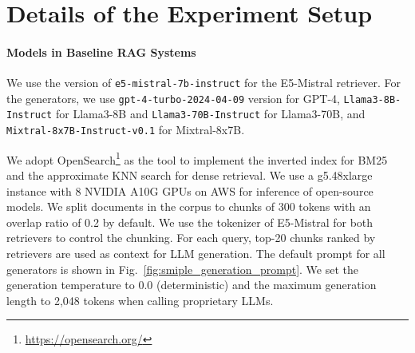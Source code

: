 \section{Details of the Experiment Setup}
\label{appendix:experiment_setup_detail}

\paragraph{Models in Baseline RAG Systems} 
We use the version of \texttt{e5-mistral-7b-instruct} for the E5-Mistral retriever. For the generators, we use \texttt{gpt-4-turbo-2024-04-09} version for GPT-4, \texttt{Llama3-8B-Instruct} for Llama3-8B and \texttt{Llama3-70B-Instruct} for Llama3-70B, and \texttt{Mixtral-8x7B-Instruct-v0.1} for Mixtral-8x7B. 

We adopt OpenSearch\footnote{\url{https://opensearch.org/}} as the tool to implement the inverted index for BM25 and the approximate KNN search for dense retrieval. We use a g5.48xlarge instance with 8 NVIDIA A10G GPUs on AWS for inference of open-source models. We split documents in the corpus to chunks of 300 tokens with an overlap ratio of 0.2 by default. We use the tokenizer of E5-Mistral for both retrievers to control the chunking. For each query, top-20 chunks ranked by retrievers are used as context for LLM generation. The default prompt for all generators is shown in Fig.~\ref{fig:smiple_generation_prompt}. We set the generation temperature to 0.0 (deterministic) and the maximum generation length to 2,048 tokens when calling proprietary LLMs.%


